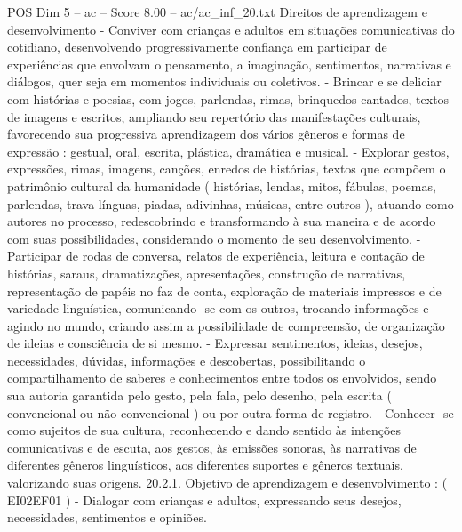 \begin{textsample}{POS Dim 5 – ac – Score 8.00 – ac/ac\_inf\_20.txt}
Direitos de aprendizagem e desenvolvimento - Conviver com crianças e adultos em situações comunicativas do cotidiano, desenvolvendo progressivamente confiança em participar de experiências que envolvam o pensamento, a imaginação, sentimentos, narrativas e diálogos, quer seja em momentos individuais ou coletivos. - Brincar e se deliciar com histórias e poesias, com jogos, parlendas, rimas, brinquedos cantados, textos de imagens e escritos, ampliando seu repertório das manifestações culturais, favorecendo sua progressiva aprendizagem dos vários gêneros e formas de expressão : gestual, oral, escrita, plástica, dramática e musical. - Explorar gestos, expressões, rimas, imagens, canções, enredos de histórias, textos que compõem o patrimônio cultural da humanidade ( histórias, lendas, mitos, fábulas, poemas, parlendas, trava-línguas, piadas, adivinhas, músicas, entre outros ), atuando como autores no processo, redescobrindo e transformando à sua maneira e de acordo com suas possibilidades, considerando o momento de seu desenvolvimento. - Participar de rodas de conversa, relatos de experiência, leitura e contação de histórias, saraus, dramatizações, apresentações, construção de narrativas, representação de papéis no faz de conta, exploração de materiais impressos e de variedade linguística, comunicando -se com os outros, trocando informações e agindo no mundo, criando assim a possibilidade de compreensão, de organização de ideias e consciência de si mesmo. - Expressar sentimentos, ideias, desejos, necessidades, dúvidas, informações e descobertas, possibilitando o compartilhamento de saberes e conhecimentos entre todos os envolvidos, sendo sua autoria garantida pelo gesto, pela fala, pelo desenho, pela escrita ( convencional ou não convencional ) ou por outra forma de registro. - Conhecer -se como sujeitos de sua cultura, reconhecendo e dando sentido às intenções comunicativas e de escuta, aos gestos, às emissões sonoras, às narrativas de diferentes gêneros linguísticos, aos diferentes suportes e gêneros textuais, valorizando suas origens. 20.2.1.
Objetivo de aprendizagem e desenvolvimento : ( EI02EF01 ) - Dialogar com crianças e adultos, expressando seus desejos, necessidades, sentimentos e opiniões.

\end{textsample}

